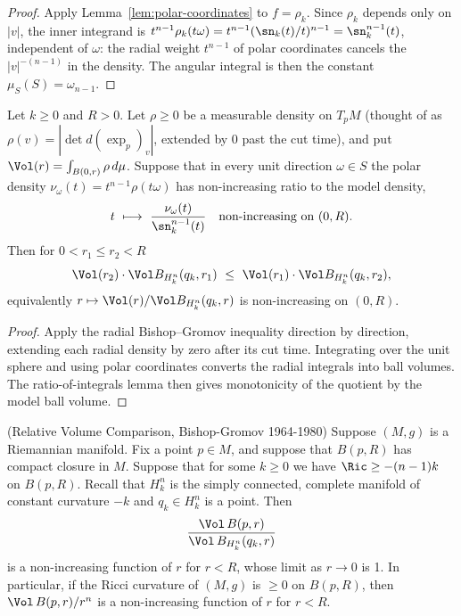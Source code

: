 \begin{proof}
\sketch
{}
\leanok
Apply Lemma~\ref{lem:polar-coordinates} to $f=\rho_k$. Since $\rho_k$ depends only
on $|v|$, the inner integrand is $t^{n-1}\rho_k(t\omega)=t^{n-1}(\sn_k(t)/t)^{n-1}
=\sn_k^{n-1}(t)$, independent of $\omega$: the radial weight $t^{n-1}$ of polar
coordinates cancels the $|v|^{-(n-1)}$ in the density. The angular integral is then
the constant $\mu_S(S)=\omega_{n-1}$.
\end{proof}

\begin{lemma}
\label{lem:bishop-gromov-ball}
\leanok



Let $k\ge0$ and $R>0$. Let $\rho\ge0$ be a measurable density on $T_pM$ (thought of
as $\rho(v)=|\det d(\exp_p)_v|$, extended by $0$ past the cut time), and put
$\Vol(r)=\int_{B(0,r)}\rho\,d\mu$. Suppose that in every unit direction
$\omega\in S$ the polar density $\nu_\omega(t)=t^{n-1}\rho(t\omega)$ has
non-increasing ratio to the model density,
$$t\ \longmapsto\ \frac{\nu_\omega(t)}{\sn_k^{n-1}(t)}
\quad\text{non-increasing on }(0,R).$$
Then for $0<r_1\le r_2<R$
$$\Vol(r_2)\cdot\Vol B_{H^n_k}(q_k,r_1)\ \le\
\Vol(r_1)\cdot\Vol B_{H^n_k}(q_k,r_2),$$
equivalently $r\mapsto\Vol(r)/\Vol B_{H^n_k}(q_k,r)$ is non-increasing on $(0,R)$.
\end{lemma}

\begin{proof}
\sketch
{}
\leanok
Apply the radial Bishop--Gromov inequality direction by direction, extending each radial density by zero after its cut time. Integrating over the unit sphere and using polar coordinates converts the radial integrals into ball volumes. The ratio-of-integrals lemma then gives monotonicity of the quotient by the model ball volume.
\end{proof}


\begin{theorem}
\label{thm:bishop-gromov}
\label{BishopGromov}


(Relative Volume Comparison, Bishop-Gromov 1964-1980) Suppose $(M,
g)$ is a Riemannian manifold. Fix a point $p\in M$, and suppose that
$B(p,R)$ has compact closure in $M$. Suppose that for some $k\ge 0$
we have $\Ric \geq -(n-1)k$ on $B(p,R)$. Recall that $H^n_k$ is
the simply connected, complete manifold of constant curvature $-k$
and $q_k\in H^n_k$ is a point. Then
\[ \frac{\Vol\,B(p,r)}{\Vol\, B_{H^n_k}(q_k,r)} \]
is a non-increasing function of $r$ for $r<R$, whose limit as $r\rightarrow 0$
is 1. In particular, if the Ricci curvature of $(M,g)$ is $\ge 0$ on $B(p,R)$,
then $\Vol\,B(p,r)/r^n$ is a non-increasing function of $r$ for $r<R$.
\end{theorem}


